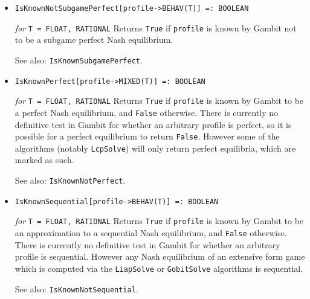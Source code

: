 \begin{itemize}


\item
\protect \large \begin{verbatim}
IsKnownNotSubgamePerfect[profile->BEHAV(T)] =: BOOLEAN
\end{verbatim}\normalsize

{\it for} {\tt T = FLOAT, RATIONAL}
\bd
Returns \verb+True+ if \verb+profile+
is known by Gambit not to be a subgame perfect Nash equilibrium.
\item [See also:] \verb+IsKnownSubgamePerfect+.
\ed

\item
\protect \large \begin{verbatim}
IsKnownPerfect[profile->MIXED(T)] =: BOOLEAN
\end{verbatim}\normalsize

{\it for} {\tt T = FLOAT, RATIONAL}
\bd 
Returns \verb+True+ if \verb+profile+
is known by Gambit to be a perfect Nash equilibrium, and \verb+False+
otherwise.  There is currently no definitive test in Gambit for
whether an arbitrary profile is perfect, so it is possible for a
perfect equilibrium to return \verb+False+.  However some of the
algorithms (notably \verb+LcpSolve+) will only return perfect
equilibria, which are marked as such.  
\item [See also:] \verb+IsKnownNotPerfect+.
\ed

\item
\protect \large \begin{verbatim}
IsKnownSequential[profile->BEHAV(T)] =: BOOLEAN
\end{verbatim}\normalsize

{\it for} {\tt T = FLOAT, RATIONAL}
\bd 
Returns \verb+True+ if \verb+profile+
is known by Gambit to be an approximation to a
sequential Nash equilibrium, and \verb+False+ otherwise.  There is
currently no definitive test in Gambit for whether an arbitrary
profile is sequential.  However any Nash equilibrium of an extensive
form game which is computed via the \verb+LiapSolve+ or
\verb+GobitSolve+ algorithms is sequential.
\item [See also:] \verb+IsKnownNotSequential+.
\ed


\end{itemize}
